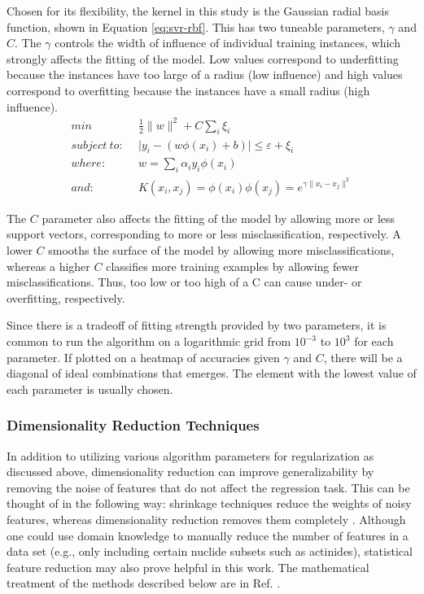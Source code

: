Chosen for its flexibility, the kernel in this study is the Gaussian radial
basis function, shown in Equation \ref{eq:svr-rbf}. This has two tuneable
parameters, $\gamma$ and $C$. The $\gamma$ controls the width of influence of
individual training instances, which strongly affects the fitting of the model.
Low values correspond to underfitting because the instances have too large of a
radius (low influence) and high values correspond to overfitting because the
instances have a small radius (high influence). 
\begin{equation}
\begin{split}
  min\ & \frac{1}{2} \lVert w \rVert ^{2} + C \sum_{i} \xi_{i} \\
  subject\ to:\ \ & \lvert y_i - (w \phi(x_i) + b) \rvert \leq \varepsilon + \xi_i \\
  where:\ & w = \sum_{i} \alpha_i y_i \phi(x_i) \\
  and:\ & K(x_i, x_j) = \phi(x_i) \phi(x_j) = e^{\gamma \lVert x_i - x_j \rVert ^{2}}
  \label{eq:svr-rbf}
\end{split}
\end{equation} 

The $C$ parameter also affects the fitting of the model by allowing more or
less support vectors, corresponding to more or less misclassification,
respectively. A lower $C$ smooths the surface of the model by allowing more
misclassifications, whereas a higher $C$ classifies more training examples by
allowing fewer misclassifications. Thus, too low or too high of a C can cause
under- or overfitting, respectively. 

Since there is a tradeoff of fitting strength provided by two parameters, it
is common to run the algorithm on a logarithmic grid from $10^{-3}$ to $10^3$
for each parameter. If plotted on a heatmap of accuracies given $\gamma$ and
$C$, there will be a diagonal of ideal combinations that emerges. The element
with the lowest value of each parameter is usually chosen. 

\subsubsection{Dimensionality Reduction Techniques}
\label{sec:dimreduc}

In addition to utilizing various algorithm parameters for regularization as
discussed above, dimensionality reduction can improve generalizability by
removing the noise of features that do not affect the regression task. This can
be thought of in the following way: shrinkage techniques reduce the weights of
noisy features, whereas dimensionality reduction removes them completely
\cite{elements_stats}.  Although one could use domain knowledge to manually
reduce the number of features in a data set (e.g., only including certain
nuclide subsets such as actinides), statistical feature reduction may also
prove helpful in this work.  The mathematical treatment of the methods
described below are in Ref.  \cite{elements_stats}.


